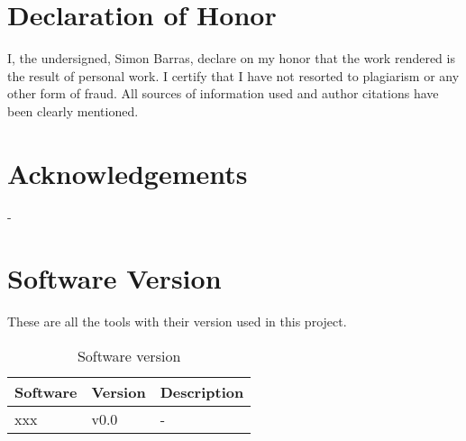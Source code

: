 \chapter{Declaration of Honor}
\label{ch:honour}
I, the undersigned, Simon Barras, declare on my honor that the work rendered is the result of
personal work. I certify that I have not resorted to plagiarism or any other form of fraud.
All sources of information used and author citations have been clearly mentioned.



\chapter{Acknowledgements}
\label{ch:remerciement}
-

\chapter{Software Version}
\label{ch:software}
These are all the tools with their version used in this project.

\begin{table}[ht]
    \centering
    \begin{tabular}{|l|p{3cm}|l|}
    \hline
    \multicolumn{1}{|c|}{\textbf{Software}} & \multicolumn{1}{c|}{\textbf{Version}} & \multicolumn{1}{c|}{\textbf{Description}} \\ \hline
    xxx                     & v0.0                                  & -        \\ \hline
    \end{tabular}
    \caption{Software version}
    \label{tab:softwareVersion}
\end{table}